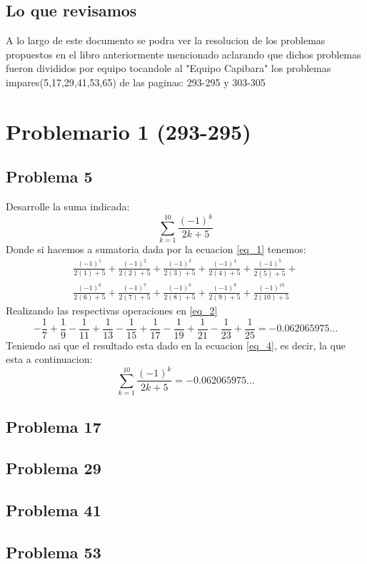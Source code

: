 \documentclass{article}
\begin{document}
  \subsection{Lo que revisamos}
    A lo largo de este documento se podra ver la resolucion de los problemas propuestos en el libro anteriormente mencionado aclarando que dichos problemas fueron divididos por equipo tocandole al "Equipo Capibara" los problemas impares(5,17,29,41,53,65) de las paginas: 293-295 y 303-305
  \section{Problemario 1 (293-295)}
  
      \subsection{Problema 5}
        Desarrolle la suma indicada:
       \begin{equation}\label{eq_1}
        \sum_{k=1}^{10}\frac{(-1)^k}{2k+5}
       \end{equation}
       Donde si hacemos a sumatoria dada por la ecuacion \ref{eq_1} tenemos:
       \begin{equation}\label{eq_2}
        \begin{split}
          \frac{(-1)^1}{2(1)+5}+\frac{(-1)^2}{2(2)+5}+\frac{(-1)^3}{2(3)+5}+\frac{(-1)^4}{2(4)+5}+\frac{(-1)^5}{2(5)+5}+\\\frac{(-1)^6}{2(6)+5}+\frac{(-1)^7}{2(7)+5}+\frac{(-1)^8}{2(8)+5}+\frac{(-1)^9}{2(9)+5}+\frac{(-1)^{10}}{2(10)+5}
        \end{split}
       \end{equation}
       Realizando las respectivas operaciones en \ref{eq_2}
       \begin{equation}\label{eq_3}
          -\frac{1}{7}+\frac{1}{9}-\frac{1}{11}+\frac{1}{13}-\frac{1}{15}+\frac{1}{17}-\frac{1}{19}+\frac{1}{21}-\frac{1}{23}+\frac{1}{25} = -0.062065975\dots
       \end{equation}
       Teniendo asi que el resultado esta dado en la ecuacion \ref{eq_4}, es decir, la que esta a continuacion: 
       \begin{equation}\label{eq_4}
        \sum_{k=1}^{10}\frac{(-1)^k}{2k+5} = -0.062065975\dots
       \end{equation}
      \subsection{Problema 17}
      \subsection{Problema 29}
      \subsection{Problema 41}
      \subsection{Problema 53}
\end{document}
